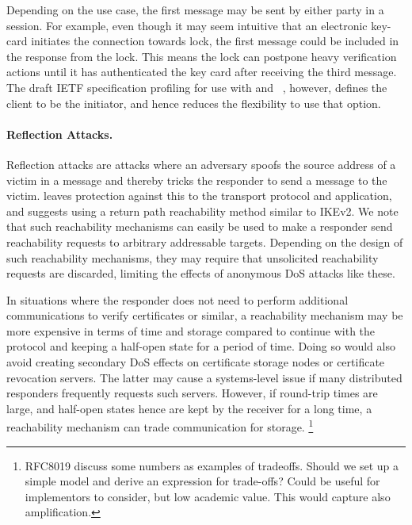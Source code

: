 \documentclass[runningheads]{llncs}
\begin{document}
Depending on the use case, the first \mEdhoc{} message may be sent by either
party in a session.
%
For example, even though it may seem intuitive that an electronic
key-card initiates the connection towards lock, the first \mEdhoc{} message
could be included in the response from the lock.
%
This means the lock can postpone heavy verification actions until it has
authenticated the key card after receiving the third \mEdhoc{} message.
%
The draft IETF specification profiling \mEdhoc{} for use with
\mCoap{} and \mOscore{} ~\cite{ietf-core-oscore-edhoc-03},
however, defines the
\mCoap{} client to be the \mEdhoc{} initiator, and hence reduces the flexibility
to use that option.
%

\paragraph{Reflection Attacks.}
Reflection attacks are attacks where an adversary spoofs the source address of a
victim in a message and thereby tricks the responder to send a message to the
victim.
%
\mEdhoc{} leaves protection against this to the transport protocol and
application, and suggests using a return path reachability method similar to IKEv2.
%
We note that such reachability mechanisms can easily be used to make a responder
send reachability requests to arbitrary addressable targets.
%
Depending on the design of such reachability mechanisms, they may require that
unsolicited reachability requests are discarded, limiting the effects of
anonymous DoS attacks like these.
%

In situations where the responder does not need to perform additional
communications to verify certificates or similar, a reachability mechanism may
be more expensive in terms of time and storage compared to continue with the
protocol and keeping a half-open state for a period of time.
%
Doing so would also avoid creating secondary DoS effects on certificate storage
nodes or certificate revocation servers.
%
The latter may cause a systems-level issue if many distributed
\mEdhoc{} responders frequently requests such servers.
%
However, if round-trip times are large, and half-open states hence are kept
by the receiver for a long time, a reachability mechanism can trade
communication for storage.
\footnote{RFC8019 discuss some numbers as examples of tradeoffs. Should we set
up a simple model and derive an expression for trade-offs? Could be useful for
implementors to consider, but low academic value. This would capture also
amplification.}
%
\end{document}
